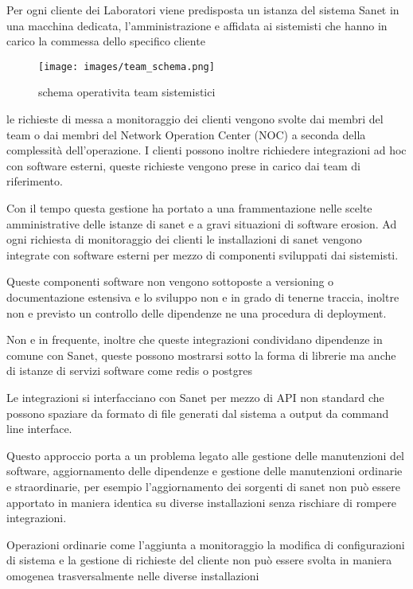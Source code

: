 \documentclass[12pt,a4paper,twoside,openright]{book}
\begin{document}
Per ogni cliente dei Laboratori viene predisposta un istanza del sistema Sanet in una macchina dedicata, l'amministrazione e affidata ai sistemisti che hanno in carico la commessa dello specifico cliente

\begin{figure}[H]
    \centering
    \texttt{[image: images/team\_schema.png]}
    \caption{schema operativita team sistemistici}
    \label{fig:enter-label}
\end{figure}

le richieste di messa a monitoraggio dei clienti vengono svolte dai membri del team o dai membri del Network Operation Center (NOC) a seconda della complessità dell'operazione. I clienti possono inoltre richiedere integrazioni ad hoc con software esterni, queste richieste vengono prese in carico dai team di riferimento.

Con il tempo questa gestione ha portato a una frammentazione nelle scelte amministrative delle istanze di sanet e a gravi situazioni di software erosion. Ad ogni richiesta di monitoraggio dei clienti le installazioni di sanet vengono integrate con software esterni per mezzo di componenti sviluppati dai sistemisti.

Queste componenti software non vengono sottoposte a versioning o documentazione estensiva e lo sviluppo non e in grado di tenerne traccia, inoltre non e previsto un controllo delle dipendenze ne una procedura di deployment.

Non e in frequente, inoltre che queste integrazioni condividano dipendenze in comune con Sanet, queste possono mostrarsi sotto la forma di librerie ma anche di istanze di servizi software come redis o postgres

Le integrazioni si interfacciano con Sanet per mezzo di API non standard che possono spaziare da formato di file generati dal sistema a output da command line interface.

Questo approccio porta a un problema legato alle gestione delle manutenzioni del software, aggiornamento delle dipendenze e gestione delle manutenzioni ordinarie e straordinarie, per esempio l'aggiornamento dei sorgenti di sanet non può essere apportato in maniera identica su diverse installazioni senza rischiare di rompere integrazioni.

Operazioni ordinarie come l'aggiunta a monitoraggio la modifica di configurazioni di sistema e la gestione di richieste del cliente non può essere svolta in maniera omogenea trasversalmente nelle diverse installazioni
\end{document}
